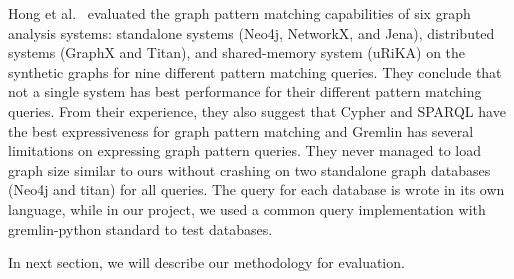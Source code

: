 Hong et al.~\cite{hong2016evaluation} evaluated the graph pattern matching capabilities of six graph analysis systems: standalone systems (Neo4j, NetworkX, and Jena), distributed systems (GraphX and Titan), and shared-memory system (uRiKA) on the synthetic graphs for nine different pattern matching queries. They conclude that not a single system has best performance for their different pattern matching queries. From their experience, they also suggest that Cypher and SPARQL have the best expressiveness for graph pattern matching and Gremlin has several limitations on expressing graph pattern queries. They never managed to load graph size similar to ours without crashing on two standalone graph databases (Neo4j and titan) for all queries. The query for each database is wrote in its own language, while in our project, we used a common query implementation with gremlin-python standard to test databases. 

In next section, we will describe our methodology for evaluation. 
